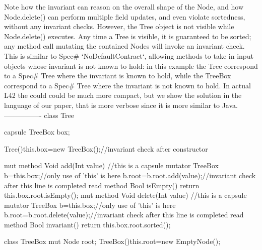 Note how the invariant can reason on the overall shape of the Node, and
how Node.delete() can perform multiple field updates,
and even violate sortedness, without any invariant checks.
However, the Tree object is not visible while Node.delete() executes.
Any time a Tree is visible, it is guaranteed to be sorted;
any method call mutating the contained Nodes will invoke an invariant check.
This is similar to Spec# `NoDefaultContract`, allowing methods to take in input
objects whose invariant is not known to hold:
in this example the Tree correspond to a Spec# Tree where the invariant
is known to hold, while the TreeBox correspond to a Spec# Tree where the invariant is not known to hold.
In actual L42 the could could be much more compact, but we show the solution in the language of our paper,
that is more verbose since it is more similar to Java.
----------------   
class Tree {
  capsule TreeBox box;

  Tree(){this.box=new TreeBox();}//invariant check after constructor

  mut method Void add(Int value) {//this is a capsule mutator
    TreeBox b=this.box;//only use of 'this' is here
    b.root=b.root.add(value);//invariant check after this line is completed
  }
  read method Bool isEmpty() {return this.box.root.isEmpty();}
  mut method Void delete(Int value) {//this is a capsule mutator
    TreeBox b=this.box;//only use of 'this' is here
     b.root=b.root.delete(value);//invariant check after this line is completed
  }
  read method Bool invariant() {return this.box.root.sorted();}
}

class TreeBox{ mut Node root; TreeBox(){this.root=new EmptyNode();} }

